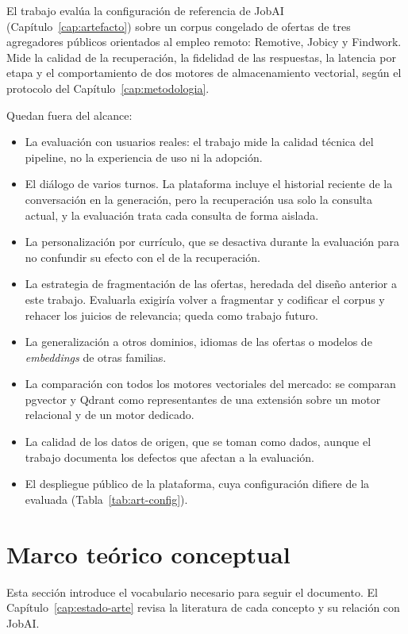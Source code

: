 El trabajo evalúa la configuración de referencia de JobAI (Capítulo~\ref{cap:artefacto}) sobre un corpus congelado de ofertas de tres agregadores públicos orientados al empleo remoto: Remotive, Jobicy y Findwork. Mide la calidad de la recuperación, la fidelidad de las respuestas, la latencia por etapa y el comportamiento de dos motores de almacenamiento vectorial, según el protocolo del Capítulo~\ref{cap:metodologia}.

Quedan fuera del alcance:
\begin{itemize}
    \item La evaluación con usuarios reales: el trabajo mide la calidad técnica del pipeline, no la experiencia de uso ni la adopción.
    \item El diálogo de varios turnos. La plataforma incluye el historial reciente de la conversación en la generación, pero la recuperación usa solo la consulta actual, y la evaluación trata cada consulta de forma aislada.
    \item La personalización por currículo, que se desactiva durante la evaluación para no confundir su efecto con el de la recuperación.
    \item La estrategia de fragmentación de las ofertas, heredada del diseño anterior a este trabajo. Evaluarla exigiría volver a fragmentar y codificar el corpus y rehacer los juicios de relevancia; queda como trabajo futuro.
    \item La generalización a otros dominios, idiomas de las ofertas o modelos de \textit{embeddings} de otras familias.
    \item La comparación con todos los motores vectoriales del mercado: se comparan pgvector y Qdrant como representantes de una extensión sobre un motor relacional y de un motor dedicado.
    \item La calidad de los datos de origen, que se toman como dados, aunque el trabajo documenta los defectos que afectan a la evaluación.
    \item El despliegue público de la plataforma, cuya configuración difiere de la evaluada (Tabla~\ref{tab:art-config}).
\end{itemize}

\section{Marco teórico conceptual}
\label{sec:marco-teorico}

Esta sección introduce el vocabulario necesario para seguir el documento. El Capítulo~\ref{cap:estado-arte} revisa la literatura de cada concepto y su relación con JobAI.

